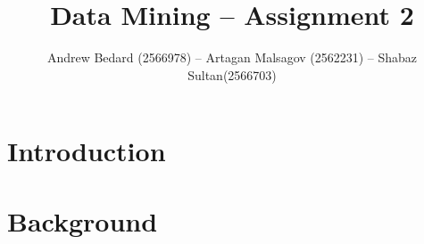 \documentclass{llncs}
\title{Data Mining -- Assignment 2}
\author{Andrew Bedard (2566978) -- Artagan Malsagov (2562231)  -- Shabaz Sultan(2566703)}
\institute{}
\begin{document}
\maketitle
\section{Introduction}

\section{Background}


          


\end{document}
